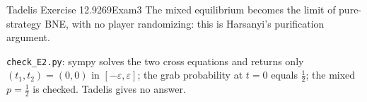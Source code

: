 \begin{exsol}{Tadelis Exercise 12.9}{269}{Exam}{3}
\interp The mixed equilibrium becomes the limit of pure-strategy BNE, with no player
randomizing: this is Harsanyi's purification argument.

\verify \texttt{check\_E2.py}: sympy solves the two cross equations and returns only
$(t_1,t_2)=(0,0)$ in $[-\varepsilon,\varepsilon]$; the grab probability at $t=0$ equals $\tfrac12$; the mixed $p=\tfrac12$ is checked. Tadelis gives
no answer.

\end{exsol}
